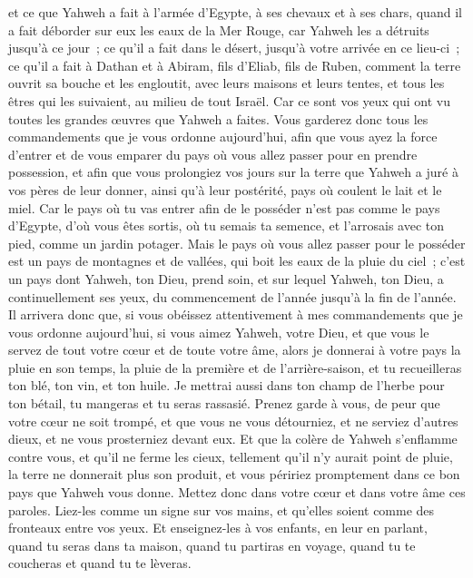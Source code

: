 \begin{multicols}{2}
et ce que Yahweh a fait à l'armée d'Egypte, à ses chevaux et à ses chars, quand il a fait déborder sur eux les eaux de la Mer Rouge, car Yahweh les a détruits jusqu'à ce jour~;
ce qu'il a fait dans le désert, jusqu'à votre arrivée en ce lieu-ci~;
ce qu'il a fait à Dathan et à Abiram, fils d'Eliab, fils de Ruben, comment la terre ouvrit sa bouche et les engloutit, avec leurs maisons et leurs tentes, et tous les êtres qui les suivaient, au milieu de tout Israël.
Car ce sont vos yeux qui ont vu toutes les grandes œuvres que Yahweh a faites.
Vous garderez donc tous les commandements que je vous ordonne aujourd'hui, afin que vous ayez la force d'entrer et de vous emparer du pays où vous allez passer pour en prendre possession,
et afin que vous prolongiez vos jours sur la terre que Yahweh a juré à vos pères de leur donner, ainsi qu'à leur postérité, pays où coulent le lait et le miel.
Car le pays où tu vas entrer afin de le posséder n'est pas comme le pays d'Egypte, d'où vous êtes sortis, où tu semais ta semence, et l'arrosais avec ton pied, comme un jardin potager.
Mais le pays où vous allez passer pour le posséder est un pays de montagnes et de vallées, qui boit les eaux de la pluie du ciel~;
c'est un pays dont Yahweh, ton Dieu, prend soin, et sur lequel Yahweh, ton Dieu, a continuellement ses yeux, du commencement de l'année jusqu'à la fin de l'année.
Il arrivera donc que, si vous obéissez attentivement à mes commandements que je vous ordonne aujourd'hui, si vous aimez Yahweh, votre Dieu, et que vous le servez de tout votre cœur et de toute votre âme,
alors je donnerai à votre pays la pluie en son temps, la pluie de la première et de l'arrière-saison, et tu recueilleras ton blé, ton vin, et ton huile.
Je mettrai aussi dans ton champ de l'herbe pour ton bétail, tu mangeras et tu seras rassasié.
Prenez garde à vous, de peur que votre cœur ne soit trompé, et que vous ne vous détourniez, et ne serviez d'autres dieux, et ne vous prosterniez devant eux.
Et que la colère de Yahweh s'enflamme contre vous, et qu'il ne ferme les cieux, tellement qu'il n'y aurait point de pluie, la terre ne donnerait plus son produit, et vous péririez promptement dans ce bon pays que Yahweh vous donne.
Mettez donc dans votre cœur et dans votre âme ces paroles. Liez-les comme un signe sur vos mains, et qu'elles soient comme des fronteaux entre vos yeux.
Et enseignez-les à vos enfants, en leur en parlant, quand tu seras dans ta maison, quand tu partiras en voyage, quand tu te coucheras et quand tu te lèveras.

\end{multicols}
